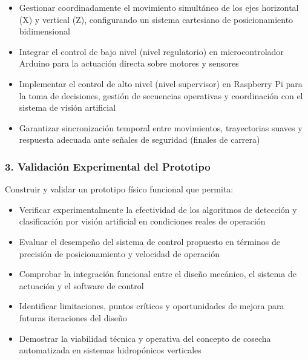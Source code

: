 \begin{itemize}
    \item Gestionar coordinadamente el movimiento simultáneo de los ejes horizontal (X) y vertical (Z), configurando un sistema cartesiano de posicionamiento bidimensional
    \item Integrar el control de bajo nivel (nivel regulatorio) en microcontrolador Arduino para la actuación directa sobre motores y sensores
    \item Implementar el control de alto nivel (nivel supervisor) en Raspberry Pi para la toma de decisiones, gestión de secuencias operativas y coordinación con el sistema de visión artificial
    \item Garantizar sincronización temporal entre movimientos, trayectorias suaves y respuesta adecuada ante señales de seguridad (finales de carrera)
\end{itemize}

\subsubsection*{3. Validación Experimental del Prototipo}

Construir y validar un prototipo físico funcional que permita:

\begin{itemize}
    \item Verificar experimentalmente la efectividad de los algoritmos de detección y clasificación por visión artificial en condiciones reales de operación
    \item Evaluar el desempeño del sistema de control propuesto en términos de precisión de posicionamiento y velocidad de operación 
    \item Comprobar la integración funcional entre el diseño mecánico, el sistema de actuación y el software de control
    \item Identificar limitaciones, puntos críticos y oportunidades de mejora para futuras iteraciones del diseño
    \item Demostrar la viabilidad técnica y operativa del concepto de cosecha automatizada en sistemas hidropónicos verticales
\end{itemize}